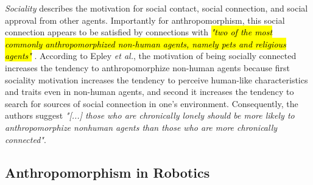 \documentclass{frontiersSCNS} %
\begin{document}
\textit{Sociality} describes the motivation for social contact, social
connection, and social approval from other agents. Importantly for
anthropomorphism, this social connection appears to be satisfied by connections
with \hl{ \textit{"two of the most commonly anthropomorphized non-human agents,
namely pets and religious agents"}} \cite{epley_seeing_2007}. According to Epley
\textit{et al.}, the motivation of being socially connected increases the
tendency to anthropomorphize non-human agents because first sociality motivation
increases the tendency to perceive human-like characteristics and traits even in
non-human agents, and second it increases the tendency to search for sources of
social connection in one's environment. Consequently, the authors suggest
\textit{"[...] those who are chronically lonely should be more likely to
anthropomorphize nonhuman agents than those who are more chronically
connected"}. 
	

\subsection{Anthropomorphism in Robotics}
\label{sec:anthropomorphism-robotics}
	
\end{document}

